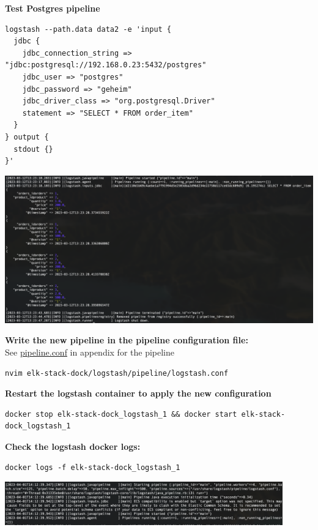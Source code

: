 \documentclass[14pt,a4paper]{extarticle}
\begin{document}
	\newpage

	\noindent \textbf{Test Postgres pipeline}
	\begin{lstlisting}[style=fish]
logstash --path.data data2 -e 'input {
  jdbc {
    jdbc_connection_string => "jdbc:postgresql://192.168.0.23:5432/postgres"
    jdbc_user => "postgres"
    jdbc_password => "geheim"
    jdbc_driver_class => "org.postgresql.Driver"
    statement => "SELECT * FROM order_item"
  }
} output {
  stdout {}
}'
	\end{lstlisting}
	\includegraphics[width=\textwidth]{images/sc05.png} 

	\noindent \textbf{Write the new pipeline in the pipeline configuration file:} \\
	See \hyperref[listings:pipeline]{pipeline.conf} in appendix for the pipeline 
	\begin{lstlisting}[style=fish]
nvim elk-stack-dock/logstash/pipeline/logstash.conf
	\end{lstlisting}

	\noindent \textbf{Restart the logstash container to apply the new configuration}
	\begin{lstlisting}[style=fish]
docker stop elk-stack-dock_logstash_1 && docker start elk-stack-dock_logstash_1
	\end{lstlisting}

	\newpage
	\noindent \textbf{Check the logstash docker logs:}
	\begin{lstlisting}[style=fish]
docker logs -f elk-stack-dock_logstash_1
	\end{lstlisting}
	\includegraphics[width=0.9\textwidth]{images/sc06.png} 
\end{document}
